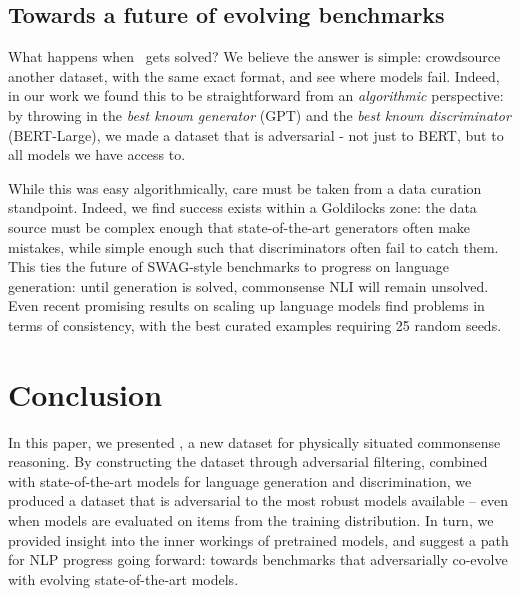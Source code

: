 \subsection{Towards a future of evolving benchmarks} What happens when {}~gets solved? We believe the answer is simple: crowdsource another dataset, with the same exact format, and see where models fail. Indeed, in our work we found this to be straightforward from an \emph{algorithmic} perspective: by throwing in the \emph{best known generator} (GPT) and the \emph{best known discriminator} (BERT-Large), we made a dataset that is adversarial - not just to BERT, but to all models we have access to.

While this was easy algorithmically, care must be taken from a data curation standpoint. Indeed, we find success exists within a Goldilocks zone: the data source must be complex enough that state-of-the-art generators often make mistakes, while simple enough such that discriminators often fail to catch them. This ties the future of {SWAG}-style benchmarks to progress on language generation: until generation is solved, commonsense NLI will remain unsolved. Even recent promising results on scaling up language models \cite{radford2019gpttwo} find problems in terms of consistency, with the best curated examples requiring 25 random seeds.

\section{Conclusion}
In this paper, we presented {}, a new dataset for physically situated commonsense reasoning. By constructing the dataset through adversarial filtering, combined with state-of-the-art models for language generation and discrimination, we produced a dataset that is adversarial to the most robust models available -- even when models are evaluated on items from the training distribution. In turn, we provided insight into the inner workings of pretrained models, and suggest a path for NLP progress going forward: towards benchmarks that adversarially co-evolve with evolving state-of-the-art models.


